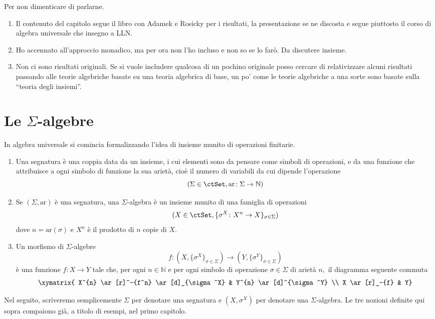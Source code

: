 \begin{warning}\label{caveat_monadi_libro_relative}
Per non dimenticare di parlarne.
\begin{enumerate}
\item Il contenuto del capitolo segue il libro con Adamek e Rosicky per i risultati, la presentazione se ne discosta e segue piuttosto il corso di 
algebra universale che insegno a LLN.
\item Ho accennato all'approccio monadico, ma per ora non l'ho incluso e non so se lo farò. Da discutere insieme.
\item Non ci sono risultati originali. Se si vuole includere qualcosa di un pochino originale posso cercare di relativizzare alcuni risultati passando
alle teorie algebriche basate su una teoria algebrica di base, un po' come le teorie algebriche a una sorte sono basate sulla ``teoria degli insiemi''.
\end{enumerate}
\end{warning} 

\section{Le $\Sigma$-algebre}\label{sec_sigma-alg}

In algebra universale si comincia formalizzando l'idea di insieme munito di operazioni finitarie.

\begin{definition}\label{def_sigma_alg}
\hfill
\begin{enumerate}
\item Una segnatura è una coppia data da un insieme, i cui elementi sono da pensare come simboli di operazioni, e da una funzione che
attribuisce a ogni simbolo di funzione la sua arietà, cioè il numero di variabili da cui dipende l'operazione
$$(\Sigma \in \ctSet, \mathrm{ar} \colon \Sigma \to \mathbb N)$$
\item Se $(\Sigma, \mathrm{ar})$ è una segnatura, una $\Sigma$-algebra è un insieme munito di una famiglia di operazioni
$$(X \in \ctSet, \{\sigma^X \colon X^{n} \to X\}_{\sigma \in \Sigma})$$
dove $n = \mathrm{ar}(\sigma)$ e $X^n$ è il prodotto di $n$ copie di $X.$
\item Un morfismo di $\Sigma$-algebre
$$f \colon (X,\{\sigma^X\}_{\sigma \in \Sigma}) \to (Y,\{\sigma^Y\}_{\sigma \in \Sigma})$$
è una funzione $f \colon X \to Y$ tale che, per ogni $n \in \mathbb N$ e per ogni simbolo di operazione $\sigma \in \Sigma$ di arietà $n,$ 
il diagramma seguente commuta 
$$\xymatrix{ X^{n} \ar[r]^-{f^n} \ar[d]_{\sigma^X} & Y^{n} \ar[d]^{\sigma^Y} \\
X \ar[r]_-{f} & Y}$$
\end{enumerate} 
Nel seguito, scriveremo semplicemente $\Sigma$ per denotare una segnatura e $(X,\sigma^X)$ per denotare una $\Sigma$-algebra.
Le tre nozioni definite qui sopra compaiono già, a titolo di esempi, nel primo capitolo.
\end{definition} 

